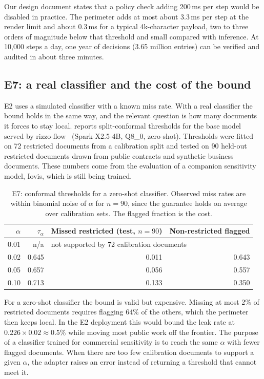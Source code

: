 Our design document states that a policy check adding 200\,ms per step would be disabled in
practice. The perimeter adds at most about 3.3\,ms per step at the render limit and about
0.3\,ms for a typical 4k-character payload, two to three orders of magnitude below that
threshold and small compared with inference. At 10{,}000 steps a day, one year of decisions
(3.65 million entries) can be verified and audited in about three minutes.

\subsection{E7: a real classifier and the cost of the bound}
\label{sec:eval-judge}

E2 uses a simulated classifier with a known miss rate. With a real classifier the bound holds
in the same way, and the relevant question is how many documents it forces to stay local.
 reports split-conformal thresholds for the base model served by
rizzo-flow~\citep{rizzoflow} (Spark-X2.5-4B, Q8\_0, zero-shot). Thresholds were fitted on 72
restricted documents from a calibration split and tested on 90 held-out restricted documents
drawn from public contracts and synthetic business documents. These numbers come from the
evaluation of a companion sensitivity model, Iovis, which is still being trained.

\begin{table}[t]
\centering\small
\begin{tabular}{@{}r r r r@{}}
\toprule
$\alpha$ & $\tau_\alpha$ & Missed restricted (test, $n{=}90$) & Non-restricted flagged \\
\midrule
0.01 & n/a & \multicolumn{2}{l}{not supported by 72 calibration documents} \\
0.02 & 0.645 & 0.011 & 0.643 \\
0.05 & 0.657 & 0.056 & 0.557 \\
0.10 & 0.713 & 0.133 & 0.350 \\
\bottomrule
\end{tabular}
\caption{E7: conformal thresholds for a zero-shot classifier. Observed miss rates are within
binomial noise of $\alpha$ for $n{=}90$, since the guarantee holds on average over calibration
sets. The flagged fraction is the cost.}
\label{tab:judge}
\end{table}

For a zero-shot classifier the bound is valid but expensive. Missing at most 2\% of restricted
documents requires flagging 64\% of the others, which the perimeter then keeps local. In the
E2 deployment this would bound the leak rate at $0.226 \times 0.02 \approx 0.5\%$ while moving
most public work off the frontier. The purpose of a classifier trained for commercial
sensitivity is to reach the same $\alpha$ with fewer flagged documents. When there are too few
calibration documents to support a given $\alpha$, the adapter raises an error instead of
returning a threshold that cannot meet it.

